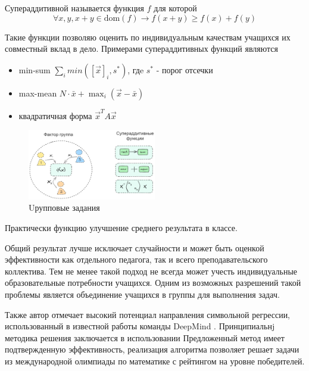 Супераддитивной называется функция $f$ для которой
\begin{equation}
    \forall x, y, x+y \in \text{dom}(f) \rightarrow f(x+y) \ge f(x) +f(y) 
\end{equation}

Такие функции позволяю оценить по индивидуальным качествам учащихся их совместный вклад в дело. Примерами супераддитивных функций являются \begin{itemize}
    \item min-sum $\sum_{i} min([\vec{x}]_i,s^*)$, гдe $s^*$ - порог отсечки
    \item max-mean $N \cdot \bar{x} + \max_i(\vec{x} - \bar{x})$
    \item квадратичная форма $\vec{x}^T A \vec{x}$
\end{itemize}

\begin{figure}[h]
    \centering
    \includegraphics[width=0.5\textwidth]{assets/final/group.excalidraw.png}
    \caption{Uрупповые задания}
    \label{group_task}
\end{figure}



Практически функцию улучшение среднего результата в классе. 

Общий результат лучше исключает
случайности и может быть оценкой эффективности как отдельного педагога, так и всего преподавательского коллектива.
Тем не менее такой подход не всегда может учесть индивидуальные образовательные потребности учащихся. Одним из возможных
разрешений такой проблемы является объединение учащихся в группы для выполнения задач.




Также автор отмечает высокий потенциал направления символьной регрессии,
использованный в известной работы команды DeepMind \cite{trinh2024solving}. Принципиальнj
методика решения заключается в использовании
Предложенный метод имеет подтвержденную эффективность, реализация алгоритма позволяет решает
задачи из международной олимпиады по математике с рейтингом на уровне победителей.












